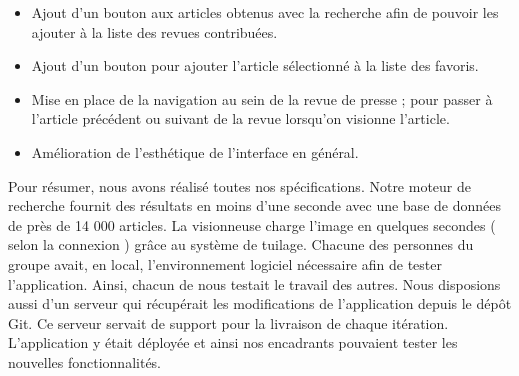 \begin{itemize}
	\item Ajout d'un bouton aux articles obtenus avec la recherche afin de pouvoir les ajouter à la liste des revues contribuées.

	\item Ajout d'un bouton pour ajouter l'article sélectionné à la liste des favoris. 

	\item Mise en place de la navigation au sein de la revue de presse ; pour passer à l'article précédent ou suivant de la revue lorsqu'on visionne l'article.

	\item Amélioration de l'esthétique de l'interface en général.

\end{itemize}

Pour résumer, nous avons réalisé toutes nos spécifications. Notre moteur de recherche fournit des résultats en moins d'une seconde avec une base de données de près de 14 000 articles. La visionneuse charge l'image en quelques secondes ( selon la connexion ) grâce au système de tuilage. Chacune des personnes du groupe avait, en local, l'environnement logiciel nécessaire afin de tester l'application. Ainsi, chacun de nous testait le travail des autres. Nous disposions aussi d'un serveur qui récupérait les modifications de l'application depuis le dépôt Git. Ce serveur servait de support pour la livraison de chaque itération. L'application y était déployée et ainsi nos encadrants pouvaient tester les nouvelles fonctionnalités.